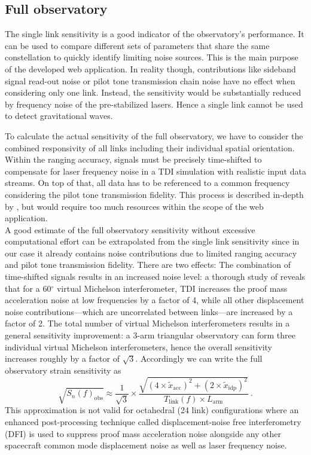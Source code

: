 \documentclass[fleqn,10pt]{<approot>/designer/latexelements/SelfArx} %
\begin{document}
\subsection{Full observatory}

The single link sensitivity is a good indicator of the observatory's performance. It can be used to compare different sets of parameters that share the same constellation to quickly identify limiting noise sources. This is the main purpose of the developed web application. In reality though, contributions like sideband signal read-out noise or pilot tone transmission chain noise have no effect when considering only one link. Instead, the sensitivity would be substantially reduced by frequency noise of the pre-stabilized lasers. Hence a single link cannot be used to detect gravitational waves.

To calculate the actual sensitivity of the full observatory, we have to consider the combined responsivity of all links including their individual spatial orientation. Within the ranging accuracy,  signals must be precisely time-shifted to compensate for laser frequency noise in a TDI simulation with realistic input data streams. On top of that, all data has to be referenced to a common frequency considering the pilot tone transmission fidelity. This process is described  in-depth by \cite{tinto2002time, otto2012tdi, lrr-2014-6}, but would require too much resources within the scope of the web application.\\

A good estimate of the full observatory sensitivity without excessive computational effort can be extrapolated from the single link sensitivity since in our case it already contains noise contributions due to limited ranging accuracy and pilot tone transmission fidelity. There are two effects: The combination of time-shifted signals results in an increased noise level: a thorough study of \cite{lrr-2014-6, cornish2001detecting} reveals that for a 60$^{\circ}$ virtual Michelson interferometer, TDI increases the proof mass acceleration noise at low frequencies by a factor of 4, while all other displacement noise contributions---which are uncorrelated between links---are increased by a factor of 2. The total number of virtual Michelson interferometers results in a general sensitivity improvement: a 3-arm triangular observatory can form three individual virtual Michelson interferometers, hence the overall sensitivity increases roughly by a factor of $\sqrt{3}$. Accordingly we can write the full observatory strain sensitivity as 
\begin{equation}
\sqrt{S_n\left(f\right)_\text{obs}} \approx \frac{1}{\sqrt{3}} \times \frac{\sqrt{\left(4 \times \widetilde{x}_\text{acc}\right)^2 + \left(2 \times \widetilde{x}_\text{idp}\right)^2}}{T_\text{link}\left(f\right) \times L_\text{arm}}~.
\label{eq:transferfunctionobs}
\end{equation}
This approximation is not valid for octahedral (24 link) configurations where an enhanced post-processing technique called displacement-noise free interferometry (DFI) \cite{chen2006interferometers, wang2013octahedron} is used to suppress proof mass acceleration noise alongside any other spacecraft common mode displacement noise as well as laser frequency noise.
\end{document}
